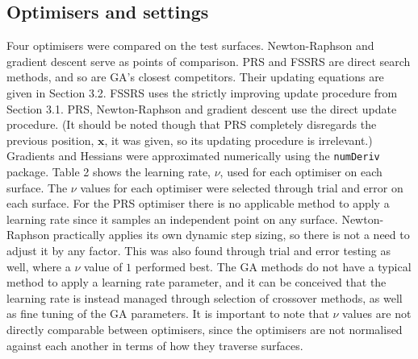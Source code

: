 \documentclass[
  a4paper,
]{article}
\newcommand{\B}[1]{\boldsymbol{#1}}
\newcommand{\+}{\phantom{-}}
\begin{document}
\subsection{Optimisers and settings}\label{optimisers-and-settings}

Four optimisers were compared on the test surfaces. Newton-Raphson and
gradient descent serve as points of comparison. PRS and FSSRS are direct
search methods, and so are GA's closest competitors. Their updating
equations are given in Section 3.2. FSSRS uses the strictly improving
update procedure from Section 3.1. PRS, Newton-Raphson and gradient
descent use the direct update procedure. (It should be noted though that
PRS completely disregards the previous position, \(\B x\), it was given,
so its updating procedure is irrelevant.) Gradients and Hessians were
approximated numerically using the \texttt{numDeriv} package. Table 2
shows the learning rate, \(\nu\), used for each optimiser on each
surface. The \(\nu\) values for each optimiser were selected through
trial and error on each surface. For the PRS optimiser there is no
applicable method to apply a learning rate since it samples an
independent point on any surface. Newton-Raphson practically applies its
own dynamic step sizing, so there is not a need to adjust it by any
factor. This was also found through trial and error testing as well,
where a \(\nu\) value of \(1\) performed best. The GA methods do not
have a typical method to apply a learning rate parameter, and it can be
conceived that the learning rate is instead managed through selection of
crossover methods, as well as fine tuning of the GA parameters. It is
important to note that \(\nu\) values are not directly comparable
between optimisers, since the optimisers are not normalised against each
another in terms of how they traverse surfaces.
\end{document}
